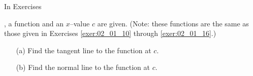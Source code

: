 {\noindent In Exercises}
{, a function and an $x$--value $c$ are given. (Note: these functions are the same as those given in Exercises \ref{exer:02_01_10} through \ref{exer:02_01_16}.)
\begin{enumerate}
\item	[(a)] Find  the tangent line to the function at $c$.
\item	[(b)] Find  the normal line to the function at $c$.
\end{enumerate}
}
